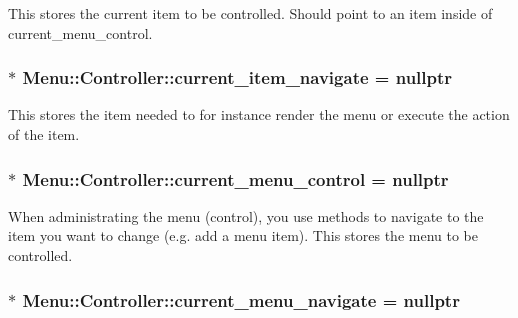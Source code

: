 This stores the current item to be controlled. Should point to an item inside of current\-\_\-menu\-\_\-control. \hypertarget{class_menu_1_1_controller_a6dfb1678cc8fd44570806ff680ac27cf}{
\subsubsection[{current\-\_\-item\-\_\-navigate}]{$\ast$ Menu\-::\-Controller\-::current\-\_\-item\-\_\-navigate = nullptr\hspace{0.3cm}{\ttfamily [private]}}}\label{class_menu_1_1_controller_a6dfb1678cc8fd44570806ff680ac27cf}
This stores the item needed to for instance render the menu or execute the action of the item. \hypertarget{class_menu_1_1_controller_a912ad4ad6b2c30e7cddf44547585a909}{
\subsubsection[{current\-\_\-menu\-\_\-control}]{$\ast$ Menu\-::\-Controller\-::current\-\_\-menu\-\_\-control = nullptr\hspace{0.3cm}{\ttfamily [private]}}}\label{class_menu_1_1_controller_a912ad4ad6b2c30e7cddf44547585a909}
When administrating the menu (control), you use methods to navigate to the item you want to change (e.\-g. add a menu item). This stores the menu to be controlled. \hypertarget{class_menu_1_1_controller_a66ffabf19a4423ccca536762f0b9df88}{
\subsubsection[{current\-\_\-menu\-\_\-navigate}]{$\ast$ Menu\-::\-Controller\-::current\-\_\-menu\-\_\-navigate = nullptr\hspace{0.3cm}{\ttfamily [private]}}}\label{class_menu_1_1_controller_a66ffabf19a4423ccca536762f0b9df88}
